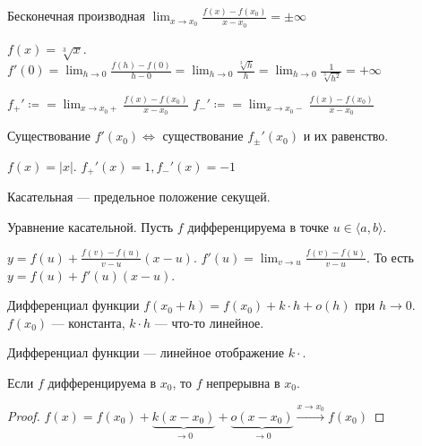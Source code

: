\begin{definition}
    Бесконечная производная $\lim_{x\to x_0}\frac{f(x) - f(x_0)}{x - x_0} = \pm \infty$
\end{definition}
\begin{example}
    $f(x) = \sqrt[3]{x}$.  $f'(0) = \lim_{h\to 0} \frac{f(h) - f(0)}{h - 0} = \lim_{h \to 0} \frac{\sqrt[3]{h}}{h} = \lim_{h \to 0} \frac{1}{\sqrt[3]{h^2}} = +\infty$
\end{example}
\begin{definition}
    $f_+' \coloneqq = \lim_{x\to x_0+} \frac{f(x)-f(x_0)}{x-x_0}$
    $f_-' \coloneqq = \lim_{x\to x_0-} \frac{f(x)-f(x_0)}{x-x_0}$
\end{definition}
\begin{remark}
    Существование  $f'(x_0) \iff$ существование $f_{\pm}'(x_0)$ и их равенство.
\end{remark}
\begin{example}
    $f(x) = |x|$.  $f_+'(x) = 1, f_-'(x)=-1$
\end{example}
\begin{definition}
    Касательная --- предельное положение секущей.
\end{definition}
\begin{example}
    Уравнение касательной. Пусть $f$ дифференцируема в точке  $u \in \langle a, b \rangle$.

    $y = f(u) + \frac{f(v) - f(u)}{v - u}(x - u)$. $f'(u) = \lim_{v \to u}\frac{f(v) - f(u)}{v - u}$. То есть $y = f(u) + f'(u)(x-u)$.
\end{example}

\begin{definition}
    Дифференциал функции $f(x_0+h) = f(x_0) + k \cdot h + o(h)$ при  $h \to 0$.  $f(x_0)$ --- константа, $k \cdot h$ --- что-то линейное.
    
    Дифференциал функции ---  линейное отображение $k \cdot$.
\end{definition}
\begin{statement}
    Если $f$ дифференцируема в  $x_0$, то  $f$ непрерывна в  $x_0$.
\end{statement}
\begin{proof}
    $f(x) = f(x_0)+\underbrace{k(x-x_0)}_{\to 0}+\underbrace{o(x-x_0)}_{\to 0} \xrightarrow{x \to x_0} f(x_0)$
\end{proof}

